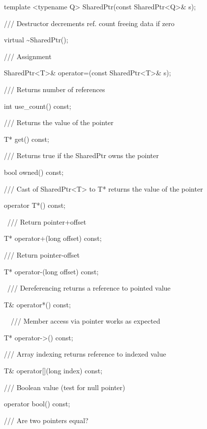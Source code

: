 \documentclass[letterpaper]{article}
\begin{document}
{\ttfamily
\ \ \ \ template {\textless}typename Q{\textgreater} SharedPtr(const SharedPtr{\textless}Q{\textgreater}\& s);}

{\ttfamily
\ \ \ \ /// Destructor decrements ref. count freeing data if zero}

{\ttfamily
\ \ \ \ virtual \~{}SharedPtr();}

{\ttfamily
\ \ \ \ /// Assignment}

{\ttfamily
\ \ \ \ SharedPtr{\textless}T{\textgreater}\& operator=(const SharedPtr{\textless}T{\textgreater}\& s);}

{\ttfamily
\ \ \ \ /// Returns number of references}

{\ttfamily
\ \ \ \ int use\_count() const;}

{\ttfamily
\ \ \ \ /// Returns the value of the pointer}

{\ttfamily
\ \ \ \ T* get() const;}

{\ttfamily
\ \ \ \ /// Returns true if the SharedPtr owns the pointer}

{\ttfamily
\ \ \ \ bool owned() const; \ }

{\ttfamily
\ \ \ \ /// Cast of SharedPtr{\textless}T{\textgreater} to T* returns the value of the pointer}

{\ttfamily
\ \ \ \ operator T*() const;}

{\ttfamily
\ \ \  \ \ /// Return pointer+offset}

{\ttfamily
\ \ \ \ T* operator+(long offset) const;}

{\ttfamily
\ \ \ \ /// Return pointer-offset}

{\ttfamily
\ \ \ \ T* operator-(long offset) const;}

{\ttfamily
\ \ \ \ \ /// Dereferencing returns a reference to pointed value}

{\ttfamily
\ \ \ \ T\& operator*() const;}

{\ttfamily
\ \ \ \ \ \ /// Member access via pointer works as expected}

{\ttfamily
\ \ \ \ T* operator-{\textgreater}() const;}

{\ttfamily
\ \ \ \ /// Array indexing returns reference to indexed value}

{\ttfamily
\ \ \ \ T\& operator[](long index) const;}

{\ttfamily
\ \ \ \ /// Boolean value (test for null pointer)}

{\ttfamily
\ \ \ \ operator bool() const;}

{\ttfamily
\ \ \ \ /// Are two pointers equal?}
\end{document}
